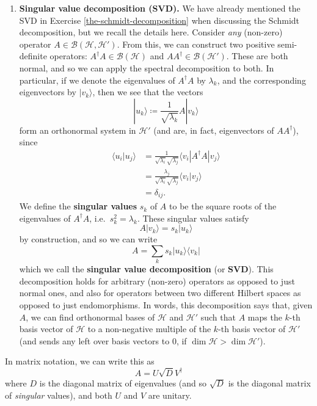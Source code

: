 \documentclass[fleqn,a4paper]{article}
\providecommand{\tightlist}{\setlength{\itemsep}{0pt}\setlength{\parskip}{0pt}}
\theoremstyle{definition}
\theoremstyle{definition}
\theoremstyle{definition}
\theoremstyle{definition}
\theoremstyle{remark}
\begin{document}
\begin{enumerate}
\def\labelenumi{\arabic{enumi}.}
\setcounter{enumi}{1}
\tightlist
\item
  \textbf{Singular value decomposition (SVD).}
  We have already mentioned the SVD in Exercise \ref{the-schmidt-decomposition} when discussing the Schmidt decomposition, but we recall the details here.
  Consider \emph{any} (non-zero) operator \(A\in\mathcal{B}(\mathcal{H},\mathcal{H}')\).
  From this, we can construct two positive semi-definite operators: \(A^\dagger A\in\mathcal{B}(\mathcal{H})\) and \(AA^\dagger\in\mathcal{B}(\mathcal{H}')\).
  These are both normal, and so we can apply the spectral decomposition to both.
  In particular, if we denote the eigenvalues of \(A^\dagger A\) by \(\lambda_k\), and the corresponding eigenvectors by \(|v_k\rangle\), then we see that the vectors
  \[
   |u_k\rangle \coloneqq \frac{1}{\sqrt{\lambda_k}}A|v_k\rangle
    \]
  form an orthonormal system in \(\mathcal{H}'\) (and are, in fact, eigenvectors of \(AA^\dagger\)), since
  \[
   \begin{aligned}
     \langle u_i|u_j\rangle
     &= \frac{1}{\sqrt{\lambda_i}\sqrt{\lambda_j}} \langle v_i|A^\dagger A|v_j\rangle
   \\&= \frac{\lambda_j}{\sqrt{\lambda_i}\sqrt{\lambda_j}} \langle v_i|v_j\rangle
   \\&= \delta_{ij}.
   \end{aligned}
    \]
  We define the \textbf{singular values} \(s_k\) of \(A\) to be the square roots of the eigenvalues of \(A^\dagger A\), i.e.~\(s_k^2=\lambda_k\).
  These singular values satisfy
  \[
   A|v_k\rangle=s_k|u_k\rangle
    \]
  by construction, and so we can write
  \[
   A = \sum_k s_k|u_k\rangle\langle v_k|
    \]
  which we call the \textbf{singular value decomposition} (or \textbf{SVD}).
  This decomposition holds for arbitrary (non-zero) operators as opposed to just normal ones, and also for operators between two different Hilbert spaces as opposed to just endomorphisms.
  In words, this decomposition says that, given \(A\), we can find orthonormal bases of \(\mathcal{H}\) and \(\mathcal{H}'\) such that \(A\) maps the \(k\)-th basis vector of \(\mathcal{H}\) to a non-negative multiple of the \(k\)-th basis vector of \(\mathcal{H}'\) (and sends any left over basis vectors to \(0\), if \(\dim\mathcal{H}>\dim\mathcal{H}'\)).
\end{enumerate}

In matrix notation, we can write this as
\[
    A = U\sqrt{D}V^\dagger
  \]
where \(D\) is the diagonal matrix of eigenvalues (and so \(\sqrt{D}\) is the diagonal matrix of \emph{singular} values), and both \(U\) and \(V\) are unitary.
\end{document}
